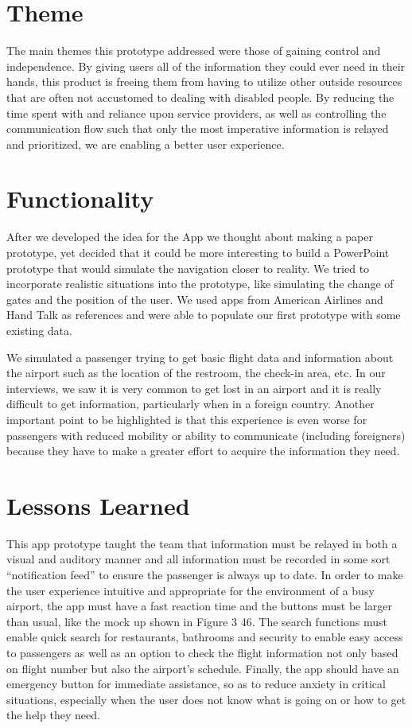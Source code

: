 \section*{Theme}
The main themes this prototype addressed were those of gaining control and independence. By giving users all of the information they could ever need in their hands, this product is freeing them from having to utilize other outside resources that are often not accustomed to dealing with disabled people. By reducing the time spent with and reliance upon service providers, as well as controlling the communication flow such that only the most imperative information is relayed and prioritized, we are enabling a better user experience.

\section*{Functionality}
After we developed the idea for the App we thought about making a paper prototype, yet decided that it could be more interesting to build a PowerPoint prototype that would simulate the navigation closer to reality. We tried to incorporate realistic situations into the prototype, like simulating the change of gates and the position of the user. We used apps from American Airlines and Hand Talk as references and were able to populate our first prototype with some existing data.

We simulated a passenger trying to get basic flight data and information about the airport such as the location of the restroom, the check-in area, etc. In our interviews, we saw it is very common to get lost in an airport and it is really difficult to get information, particularly when in a foreign country. Another important point to be highlighted is that this experience is even worse for passengers with reduced mobility or ability to communicate (including foreigners) because they have to make a greater effort to acquire the information they need.

\section*{Lessons Learned}
This app prototype taught the team that information must be relayed in both a visual and auditory manner and all information must be recorded in some sort “notification feed” to ensure the passenger is always up to date. In order to make the user experience intuitive and appropriate for the environment of a busy airport, the app must have a fast reaction time and the buttons must be larger than usual, like the mock up shown in Figure 3 46. The search functions must enable quick search for restaurants, bathrooms and security to enable easy access to passengers as well as an option to check the flight information not only based on flight number but also the airport’s schedule.  Finally, the app should have an emergency button for immediate assistance, so as to reduce anxiety in critical situations, especially when the user does not know what is going on or how to get the help they need.


